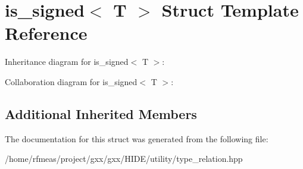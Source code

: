 \hypertarget{structis__signed}{}\section{is\+\_\+signed$<$ T $>$ Struct Template Reference}
\label{structis__signed}


Inheritance diagram for is\+\_\+signed$<$ T $>$\+:


Collaboration diagram for is\+\_\+signed$<$ T $>$\+:
\subsection*{Additional Inherited Members}


The documentation for this struct was generated from the following file\+:\begin{DoxyCompactItemize}
\item 
/home/rfmeas/project/gxx/gxx/\+H\+I\+D\+E/utility/type\+\_\+relation.\+hpp\end{DoxyCompactItemize}
